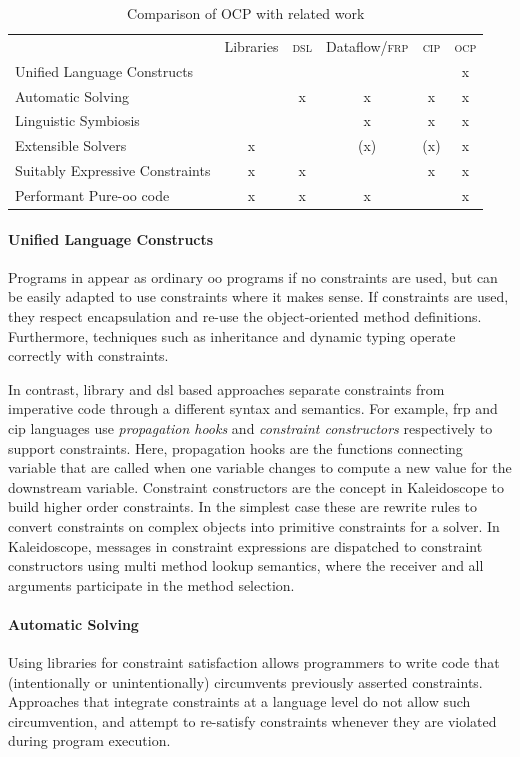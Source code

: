 \begin{table}
  \centering
  \begin{tabular}{l|c|c|c|c|c}
    & Libraries & \textsc{dsl} & Dataflow/\textsc{frp} & \textsc{cip} & \textsc{ocp} \\
    Unified Language Constructs & & & & & x \\
    Automatic Solving & & x & x & x & x \\
    Linguistic Symbiosis & & & x & x & x \\
    Extensible Solvers & x & & (x) & (x) & x \\
    Suitably Expressive Constraints & x & x & & x & x \\
    Performant Pure-\ac{oo} code & x & x & x & & x \\
  \end{tabular}
  \caption{Comparison of OCP with related work}
  \label{tab:cmp-constraint-lang-approaches}
\end{table}

\paragraph{Unified Language Constructs}
Programs in \langname appear as ordinary \ac{oo} programs if no
constraints are used, but can be easily adapted to use constraints
where it makes sense. If constraints are used, they respect
encapsulation and re-use the object-oriented method
definitions. Furthermore,  techniques such as
inheritance and dynamic typing operate correctly with constraints.

In contrast, library and \ac{dsl} based approaches separate
constraints from imperative code through a different syntax and
semantics. For example, \ac{frp} and \ac{cip} languages use
\emph{propagation hooks} and \emph{constraint constructors}
respectively to support constraints. Here, propagation hooks are the
functions connecting variable that are called when one variable
changes to compute a new value for the downstream variable. Constraint
constructors are the concept in Kaleidoscope to build higher order
constraints. In the simplest case these are rewrite rules to convert
constraints on complex objects into primitive constraints for a
solver. In Kaleidoscope, messages in constraint expressions are
dispatched to constraint constructors using multi method lookup
semantics, where the receiver and all arguments participate in the
method selection.

\paragraph{Automatic Solving}
Using libraries for constraint satisfaction allows programmers to
write code that (intentionally or unintentionally) circumvents
previously asserted constraints. Approaches that integrate constraints
at a language level do not allow such circumvention, and attempt to
re-satisfy constraints whenever they are violated during program
execution.


